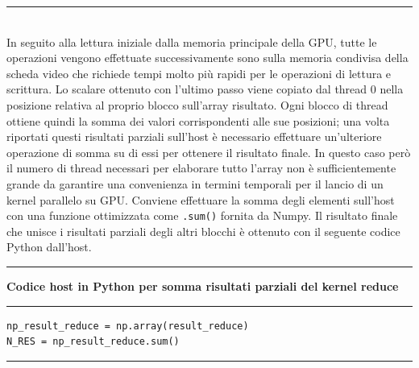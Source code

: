 \documentclass[12pt,a4paper]{report}
\begin{document}
\noindent\rule[0.5ex]{\linewidth}{1pt} \\[10pt]
In seguito alla lettura iniziale dalla memoria principale della GPU, tutte le operazioni vengono effettuate successivamente sono sulla memoria condivisa della scheda video che richiede tempi molto più rapidi per le operazioni di lettura e scrittura. \newline
Lo scalare ottenuto con l'ultimo passo viene copiato dal thread 0 nella posizione relativa al proprio blocco sull'array risultato. 
Ogni blocco di thread ottiene quindi la somma dei valori corrispondenti alle sue posizioni; una volta riportati questi risultati parziali sull'host è necessario effettuare un'ulteriore operazione di somma su di essi per ottenere il risultato finale. 
In questo caso però il numero di thread necessari per elaborare tutto l'array non è sufficientemente grande da garantire una convenienza in termini temporali per il lancio di un kernel parallelo su GPU. Conviene effettuare la somma degli elementi sull'host con una funzione ottimizzata come \verb|.sum()| fornita da Numpy. \newline
Il risultato finale che unisce i risultati parziali degli altri blocchi è ottenuto con il seguente codice Python dall'host. \\[10pt]
\noindent\rule[0.5ex]{\linewidth}{2pt}
\small{\textbf{Codice host in Python per somma risultati parziali del kernel reduce}} \\
\noindent\rule[0.5ex]{\linewidth}{1pt}
\begin{lstlisting}
np_result_reduce = np.array(result_reduce) 
N_RES = np_result_reduce.sum()
\end{lstlisting}
\noindent\rule[0.5ex]{\linewidth}{1pt} \\[10pt]
\end{document}
